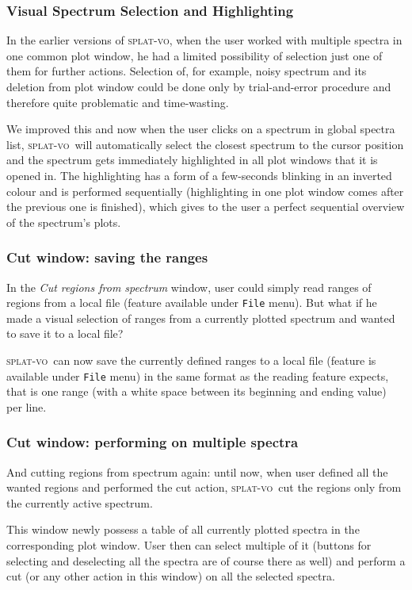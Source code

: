 \documentclass[final,authoryear,5p,times,twocolumn]{elsarticle}
\newcommand{\splatvo}{\textsc{splat-vo}}
\begin{document}
\subsubsection{Visual Spectrum Selection and Highlighting}

In the earlier versions of \splatvo, when the user worked with multiple
spectra in one common plot window, he  had a limited possibility of
selection just one of them for further actions. Selection of, for example, noisy
spectrum and its deletion from plot window could be done only by
trial-and-error procedure and therefore quite problematic and time-wasting.

We improved this and now when the user clicks on a spectrum in global spectra
list, \splatvo\ will automatically select the closest spectrum to the cursor
position and  the spectrum gets immediately highlighted in all plot windows
that it is opened in. The highlighting has a form of a few-seconds blinking in
an inverted colour and is performed sequentially (highlighting in one plot
window comes after the previous one is finished), which gives to the user a
perfect sequential overview of the spectrum's plots.

\subsubsection{Cut window: saving the ranges}

In the \emph{Cut regions from spectrum} window, user could simply read
ranges of regions from a local file (feature available under \texttt{File}
menu). But what if he made a visual selection of ranges from a
currently plotted spectrum and wanted to save it to a local file?

\splatvo\ can now save the currently defined
ranges to a local file (feature is available under \texttt{File} menu) in the
same format as the reading feature expects, that is one range (with a
white space between its beginning and ending value) per line.

\subsubsection{Cut window: performing on multiple spectra}

And cutting regions from spectrum again: until now, when user defined
all the wanted regions and performed the cut action, \splatvo\ cut the
regions only from the currently active spectrum.

This window newly possess a table of all
currently plotted spectra in the corresponding plot window. User then
can select multiple of it (buttons for selecting and deselecting all
the spectra are of course there as well) and perform a cut (or any
other action in this window) on all the selected spectra.
\end{document}
